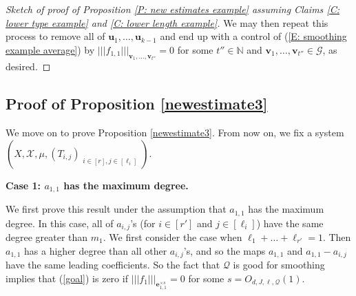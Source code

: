 \documentclass[11pt]{amsart}
\theoremstyle{definition}
\DeclareMathOperator*{\E}{\mathbb{E}}
\newcommand{\N}{{\mathbb N}}
\newcommand{\Z}{{\mathbb Z}}
\newcommand{\CQ}{{\mathcal Q}}
\newcommand{\CX}{{\mathcal X}}
\newcommand{\be}{{\mathbf{e}}}
\newcommand{\bu}{{\mathbf{u}}}
\newcommand{\bv}{{\mathbf{v}}}
\newcommand{\nnorm}[1]{\lvert\!|\!| #1|\!|\!\rvert}
\newcommand{\1}{{\mathbf{1}}}
\begin{document}
\begin{proof}[Sketch of proof of Proposition \ref{P: new estimates example} assuming Claims \ref{C: lower type example} and \ref{C: lower length example}]
We may then repeat this process to remove all of $\bu_{1},\dots,\bu_{k-1}$ and end up with a control of (\ref{E: smoothing example average}) by $\nnorm{f_{1,1}}_{\bv_{1},\dots,\bv_{t''}}=0$ for some $t''\in\N$ and $\bv_{1},\dots,\bv_{t''}\in\mathcal{G}$,  as desired.
    \end{proof}



\subsection{Proof of Proposition \ref{newestimate3}}
We move on to prove Proposition \ref{newestimate3}. From now on, we fix a system $(X, \CX, \mu, (T_{i,j})_{\substack{i\in[r], j\in[\ell_i]}})$.







\smallskip
\textbf{Case 1: $a_{1,1}$ has the maximum degree.}
\smallskip

We first prove this result under the assumption that $a_{1,1}$ has the maximum degree. 
In this case, all of $a_{i,j}$'s (for $i\in[r']$ and $j\in[\ell_{i}]$) have the same degree greater than $m_{1}$.
 We first consider the case when $\ell_{1}+\dots+\ell_{r'}=1$. Then $a_{1,1}$ has a higher degree than all other $a_{i,j}$'s, and so the maps $a_{1,1}$ and $a_{1,1}-a_{i,j}$ have the same leading coefficients. So the fact that $\CQ$ is {good for smoothing} implies that (\ref{goal}) is zero if $\nnorm{f_1}_{\be_{1,1}^{\times s}}=0$ for some $s=O_{d,J,\ell, \CQ}(1)$.
\end{document}
